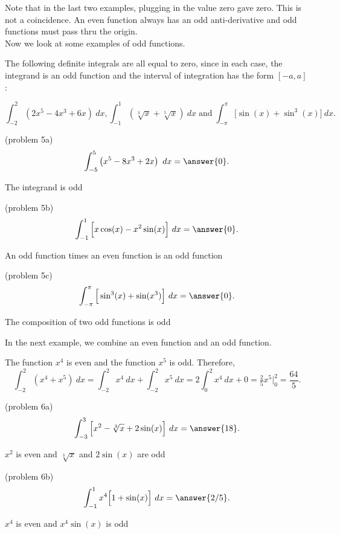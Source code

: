 \documentclass{ximera}
\begin{document}
Note that in the last two examples, plugging in the value zero gave zero.  This is not a coincidence.
An even function always has an odd anti-derivative and odd functions must pass thru the origin.\\
Now we look at some examples of odd functions.

\begin{example}[example 5]
The following definite integrals are all equal to zero, since in each case, the integrand is an odd function and the 
interval of integration has the form $[-a, a]$:

\[\int_{-2}^2 \left(2x^5 - 4x^3 + 6x \right)\ dx, \int_{-1}^1 \left(\sqrt[3] x + \sqrt[5]x\right) \ dx  \; \text{and} \; \int_{-\pi}^\pi \Big[\sin(x) + \sin^3(x)\Big] \ dx.\]
\end{example}

\begin{problem}(problem 5a)
\[\int_{-5}^5 \left(x^5 - 8x^3 +2x \right) \ dx =\answer {0}.\]
\begin{hint}
The integrand is odd
\end{hint}
\end{problem}

\begin{problem}(problem 5b)
\[\int_{-1}^1 \Big[x\cos(x) - x^2\sin(x) \Big] \ dx =\answer {0}.\]
\begin{hint}
An odd function times an even function is an odd function
\end{hint}
\end{problem}

\begin{problem}(problem 5c)
\[\int_{-\pi}^\pi \Big[\sin^3(x) + \sin(x^3)\Big] \ dx =\answer {0}.\]
\begin{hint}
The composition of two odd functions is odd
\end{hint}
\end{problem}


In the next example, we combine an even function and an odd function.

\begin{example}[example 6]
The function $x^4$ is even and the function $x^5$ is odd.  Therefore,
\[\int_{-2}^2 (x^4 + x^5) \ dx = \int_{-2}^2 x^4 \ dx + \int_{-2}^2 x^5 \ dx = 2\int_0^2 x^4 \ dx + 0 = \tfrac{2}{5}x^5\Bigg|_0^2 = \frac{64}{5}.\]
\end{example}

\begin{problem}(problem 6a)
\[\int_{-3}^3 \Big[x^2 - \sqrt[3]x +2\sin(x) \Big] \ dx =\answer {18}.\]
\begin{hint}
$x^2$ is even and $\sqrt[3]x$ and $2\sin(x)$ are odd
\end{hint}
\end{problem}

\begin{problem}(problem 6b)
\[\int_{-1}^{1} x^4\Big[1 + \sin(x)\Big] \ dx =\answer {2/5}.\]
\begin{hint}
$x^4$ is even and $x^4\sin(x)$ is odd
\end{hint}
\end{problem}
\end{document}
